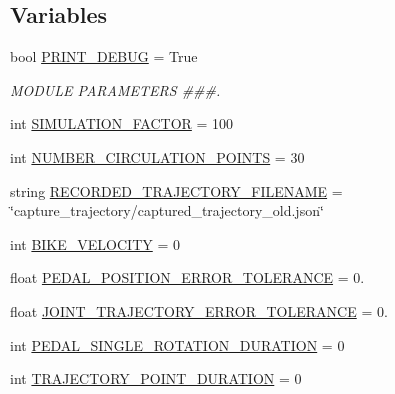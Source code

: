 \subsection*{Variables}
\begin{DoxyCompactItemize}
\item 
bool \mbox{\hyperlink{namespacepedal__simulation__interpolation__lennard_aaaeb9d77bf6369027c975750d613c50f}{P\+R\+I\+N\+T\+\_\+\+D\+E\+B\+UG}} = True
\begin{DoxyCompactList}\small\item\em M\+O\+D\+U\+LE P\+A\+R\+A\+M\+E\+T\+E\+RS \#\#\#. \end{DoxyCompactList}\item 
int \mbox{\hyperlink{namespacepedal__simulation__interpolation__lennard_ae98a52d39cf83c19d30b70c322f6e248}{S\+I\+M\+U\+L\+A\+T\+I\+O\+N\+\_\+\+F\+A\+C\+T\+OR}} = 100
\item 
int \mbox{\hyperlink{namespacepedal__simulation__interpolation__lennard_a563b67735f05f4b4c737ec84ceb1f0bb}{N\+U\+M\+B\+E\+R\+\_\+\+C\+I\+R\+C\+U\+L\+A\+T\+I\+O\+N\+\_\+\+P\+O\+I\+N\+TS}} = 30
\item 
string \mbox{\hyperlink{namespacepedal__simulation__interpolation__lennard_aa67e52f7771732ab256a8d8d5f084d41}{R\+E\+C\+O\+R\+D\+E\+D\+\_\+\+T\+R\+A\+J\+E\+C\+T\+O\+R\+Y\+\_\+\+F\+I\+L\+E\+N\+A\+ME}} = \char`\"{}capture\+\_\+trajectory/captured\+\_\+trajectory\+\_\+old.\+json\char`\"{}
\item 
int \mbox{\hyperlink{namespacepedal__simulation__interpolation__lennard_a5db428c1f9f3d7cb72d58068e5594b33}{B\+I\+K\+E\+\_\+\+V\+E\+L\+O\+C\+I\+TY}} = 0
\item 
float \mbox{\hyperlink{namespacepedal__simulation__interpolation__lennard_a9c7b44e4ea4981585f68cf184b27c529}{P\+E\+D\+A\+L\+\_\+\+P\+O\+S\+I\+T\+I\+O\+N\+\_\+\+E\+R\+R\+O\+R\+\_\+\+T\+O\+L\+E\+R\+A\+N\+CE}} = 0.
\item 
float \mbox{\hyperlink{namespacepedal__simulation__interpolation__lennard_aba0265a04b482028d7b18755d8140084}{J\+O\+I\+N\+T\+\_\+\+T\+R\+A\+J\+E\+C\+T\+O\+R\+Y\+\_\+\+E\+R\+R\+O\+R\+\_\+\+T\+O\+L\+E\+R\+A\+N\+CE}} = 0.
\item 
int \mbox{\hyperlink{namespacepedal__simulation__interpolation__lennard_ae7f288760f4af3c3efdc2bac26a01d61}{P\+E\+D\+A\+L\+\_\+\+S\+I\+N\+G\+L\+E\+\_\+\+R\+O\+T\+A\+T\+I\+O\+N\+\_\+\+D\+U\+R\+A\+T\+I\+ON}} = 0
\item 
int \mbox{\hyperlink{namespacepedal__simulation__interpolation__lennard_ac86d76511cbbde4ae4af6b8895729ab9}{T\+R\+A\+J\+E\+C\+T\+O\+R\+Y\+\_\+\+P\+O\+I\+N\+T\+\_\+\+D\+U\+R\+A\+T\+I\+ON}} = 0

\end{DoxyCompactItemize}
